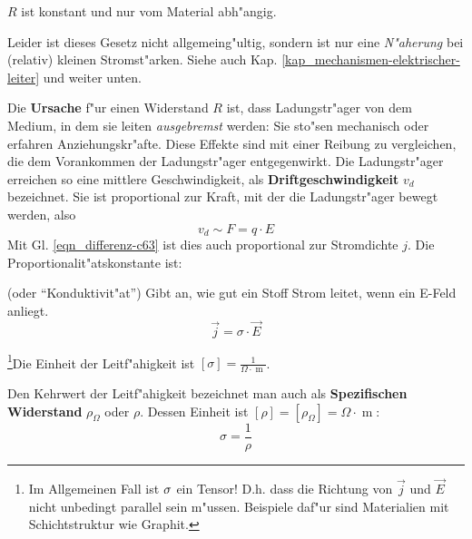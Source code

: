 \begin{Wichtig}
    $R$ ist
   konstant und nur vom Material abh"angig.
\end{Wichtig}

Leider ist dieses Gesetz nicht allgemeing"ultig, sondern ist nur eine
\emph{N"aherung} bei (relativ) kleinen Stromst"arken. Siehe auch
Kap. \ref{kap_mechanismen-elektrischer-leiter} und weiter unten.

\bigskip

Die \textbf{Ursache} f"ur einen Widerstand $R$ ist, dass Ladungstr"ager
von dem Medium, in dem sie leiten \emph{ausgebremst} werden: Sie
sto"sen mechanisch oder erfahren Anziehungskr"afte. Diese Effekte sind
mit einer Reibung zu vergleichen, die dem Vorankommen der
Ladungstr"ager entgegenwirkt. Die Ladungstr"ager erreichen so eine
mittlere Geschwindigkeit, als
\textbf{Driftgeschwindigkeit} $v_d$
bezeichnet. Sie ist proportional zur Kraft, mit der die Ladungstr"ager
bewegt werden, also
\begin{equation}
   \label{eqn_differenz-c71}
   v_d \sim F = q \cdot E
\end{equation}
Mit Gl. \eqref{eqn_differenz-c63} ist dies auch proportional zur Stromdichte
$j$. Die Proportionalit"atskonstante ist:
\begin{Def}
    (oder
   "`Konduktivit"at"') Gibt an, wie gut ein
   Stoff Strom leitet, wenn ein E-Feld anliegt.
   \begin{equation}
      \label{eqn_differenz-c72}
      \vec j = \sigma \cdot \vec E
   \end{equation}
\end{Def}
\footnote{Im Allgemeinen Fall ist ${\mathcal{\sigma}}$ ein Tensor! D.h. dass
  die Richtung von $\vec j$ und $\vec E$ nicht unbedingt parallel sein
  m"ussen. Beispiele daf"ur sind Materialien mit Schichtstruktur wie
  Graphit.}Die Einheit der Leitf"ahigkeit ist $[\sigma] = \frac{1}{\Omega
  \cdot \operatorname{m}}$.

Den Kehrwert der Leitf"ahigkeit bezeichnet man auch als
\textbf{Spezifischen Widerstand}
$\rho_\Omega$ oder $\rho$. Dessen Einheit ist $[\rho] = [\rho_\Omega]
= \Omega \cdot \operatorname{m}$:
\begin{equation}
   \label{eqn_differenz-c74}
   \sigma = \frac{1}{\rho}
\end{equation}

